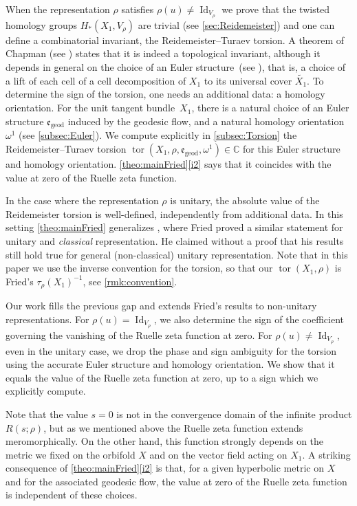 \documentclass[JEP,XML,SOM,Unicode,NoFloatCountersInSection,published]{cedram}
\theoremstyle{plain}
\theoremstyle{definition}
\theoremstyle{remark}
\newcommand{\C}{\mathbb{C}}
\newcommand{\geod}{\mathrm{geod}}
\DeclareMathOperator{\Id}{Id}
\numberwithin{equation}{section}
\DeclareMathOperator{\tor}{tor}
\begin{document}
When the representation $\rho$ satisfies $\rho(u) \neq\Id_{V_\rho}$ we prove that the twisted homology groups $H_*(X_1, V_\rho)$ are trivial (see \cref{sec:Reidemeister}) and one can define a combinatorial invariant, the Reidemeister--Turaev torsion. A theorem of Chapman (see \cite[Th.\,1]{Chapman}) states that it is indeed a topological invariant, although it depends in general on the choice of an Euler structure~(see \cite{Turaev_book}), that is, a choice of a lift of each cell of a cell decomposition of $X_1$ to its universal cover $\widetilde{X_1}$. To determine the sign of the torsion, one needs an additional data: a homology orientation. For the unit tangent bundle~$X_1$, there is a natural choice of an Euler structure $\mathfrak e_{\geod}$ induced by the geodesic flow, and a natural homology orientation $\omega^1$ (see \cref{subsec:Euler}). We compute explicitly in \cref{subsec:Torsion} the Reidemeister--Turaev torsion $\tor(X_1, \rho, \mathfrak e_{\geod}, \omega^1) \in \C$ for this Euler structure and homology orientation. \cref{theo:mainFried}\eqref{i2} says that it coincides with the value at zero of the Ruelle zeta function.

In the case where the representation $\rho$ is unitary, the absolute value of the Reidemeister torsion is well-defined, independently from additional data. In this setting \cref{theo:mainFried} generalizes \cite[Th.\,2 \& 3]{fried1986fuchsian}, where Fried proved a similar statement for unitary and \emph{classical} representation. He claimed without a proof that his results still hold true for general (non-classical) unitary representation. Note that in this paper we use the inverse convention for the torsion, so that our $\tor(X_1, \rho)$ is Fried's $\tau_\rho(X_1)^{-1}$, see \cref{rmk:convention}.

Our work fills the previous gap and extends Fried's results to non-unitary representations. For $\rho(u)=\Id_{V_\rho}$, we also determine the sign of the coefficient governing the vanishing of the Ruelle zeta function at zero. For $\rho(u) \neq \Id_{V_\rho}$, even in the unitary case, we drop the phase and sign ambiguity for the torsion using the accurate Euler structure and homology orientation. We show that it equals the value of the Ruelle zeta function at zero, up to a sign which we explicitly compute.

Note that the value $s=0$ is not in the convergence domain of the infinite product $R(s; \rho)$, but as we mentioned above the Ruelle zeta function extends meromorphically. On the other hand, this function strongly depends on the metric we fixed on the orbifold $X$ and on the vector field acting on $X_1$. A striking consequence of \cref{theo:mainFried}\eqref{i2} is that, for a given hyperbolic metric on $X$ and for the associated geodesic flow, the value at zero of the Ruelle zeta function is independent of these choices.
\end{document}
